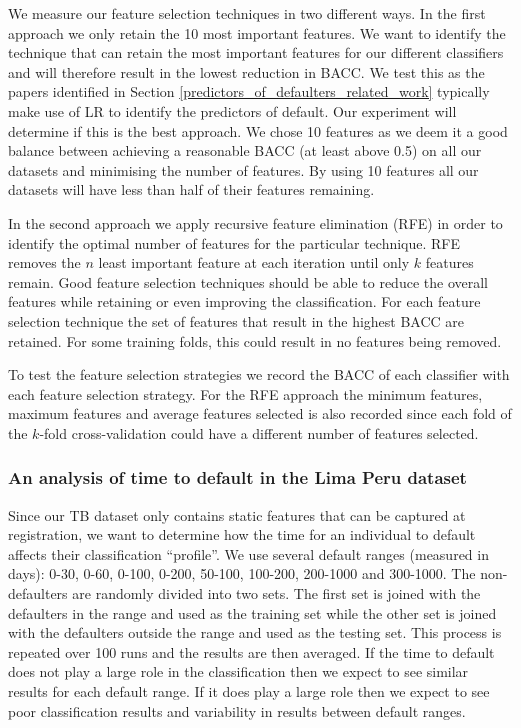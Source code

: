 \documentclass{sig-alternate-05-2015}
\begin{document}
	We measure our feature selection techniques in two different ways. In the first approach we only retain the 10 most important features.  We want to identify the technique that can retain the most important features for our different classifiers and will therefore result in the lowest reduction in BACC. We test this as the papers identified in Section \ref{predictors_of_defaulters_related_work} typically make use of LR to identify the predictors of default. Our experiment will determine if this is the best approach. We chose 10 features as we deem it a good balance between achieving a reasonable BACC (at least above 0.5) on all our datasets and minimising the number of features. By using 10 features all our datasets will have less than half of their features remaining.
	
	In the second approach we apply recursive feature elimination (RFE) in order to identify the optimal number of features for the particular technique. RFE removes the $n$ least important feature at each iteration until only $k$ features remain. Good feature selection techniques should be able to reduce the overall features while retaining or even improving the classification. For each feature selection technique the set of features that result in the highest BACC are retained. For some training folds, this could result in no features being removed. 
	
	To test the feature selection strategies we record the BACC of each classifier with each feature selection strategy. For the RFE approach the minimum features, maximum features and average features selected is also recorded since each fold of the $k$-fold cross-validation could have a different number of features selected.
	
	\subsubsection{An analysis of time to default in the Lima Peru dataset}
	Since our TB dataset only contains static features that can be captured at registration, we want to determine how the time for an individual to default affects their classification ``profile''. We use several default ranges (measured in days): 0-30, 0-60, 0-100, 0-200, 50-100, 100-200, 200-1000 and 300-1000. The non-defaulters are randomly divided into two sets. The first set is joined with the defaulters in the range and used as the training set while the other set is joined with the defaulters outside the range and used as the testing set. This process is repeated over 100 runs and the results are then averaged. If the time to default does not play a large role in the classification then we expect to see similar results for each default range. If it does play a large role then we expect to see poor classification results and variability in results between default ranges.
	
\end{document}
